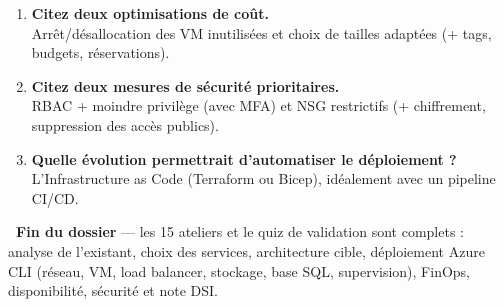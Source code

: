 \documentclass[11pt,a4paper]{article}
\newcommand{\emo}[1]{\raisebox{-0.14em}{\twemoji{#1}}}
\newcommand{\eParty}{\emo{1f389}}
\begin{document}
\begin{enumerate}[leftmargin=2.2em]
\item \textbf{Citez deux optimisations de coût.}\\ Arrêt/désallocation des VM inutilisées et choix de tailles adaptées (+ tags, budgets, réservations).
\item \textbf{Citez deux mesures de sécurité prioritaires.}\\ RBAC + moindre privilège (avec MFA) et NSG restrictifs (+ chiffrement, suppression des accès publics).
\item \textbf{Quelle évolution permettrait d'automatiser le déploiement ?}\\ L'Infrastructure as Code (Terraform ou Bicep), idéalement avec un pipeline CI/CD.
\end{enumerate}

\vspace{6pt}
\begin{tcolorbox}[enhanced, sharp corners, boxrule=0pt, leftrule=4pt, colback=okgreenbg, colframe=okgreen,
   left=4.5mm,right=4.5mm,top=3.6mm,bottom=3.6mm]
{\sffamily\bfseries\color{okgreen}\eParty~Fin du dossier} — les 15 ateliers et le quiz de validation sont
complets : analyse de l'existant, choix des services, architecture cible, déploiement Azure CLI (réseau,
VM, load balancer, stockage, base SQL, supervision), FinOps, disponibilité, sécurité et note DSI.
\end{tcolorbox}
\end{document}
